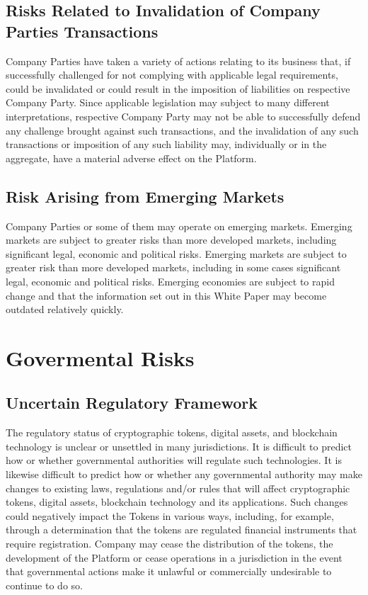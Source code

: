 \documentclass[12pt]{report}
\begin{document}
\subsection{Risks Related to Invalidation of Company Parties Transactions}
Company Parties have taken a variety of actions relating to its business that, if successfully challenged for not complying with applicable legal requirements, could be invalidated or could result in the imposition of liabilities on respective Company Party. Since applicable legislation may subject to many different interpretations, respective Company Party may not be able to successfully defend any challenge brought against such transactions, and the invalidation of any such transactions or imposition of any such liability may, individually or in the aggregate, have a
material adverse effect on the Platform.

\subsection{Risk Arising from Emerging Markets}
Company Parties or some of them may operate on emerging markets. Emerging markets are subject to greater risks than more developed markets, including significant legal, economic and political risks. Emerging markets are subject to greater risk than more developed markets, including in some cases significant legal, economic and political risks. Emerging economies are subject to rapid change and that the information set out in this White Paper may become outdated relatively quickly.

\section{Govermental Risks}
\subsection{Uncertain Regulatory Framework}
The regulatory status of cryptographic tokens, digital assets, and blockchain technology is unclear or unsettled in many jurisdictions. It is difficult to predict how or whether governmental authorities will regulate such technologies. It is likewise difficult to predict how or whether any governmental authority may make changes to existing laws, regulations and/or rules that will affect cryptographic tokens, digital assets, blockchain technology and its applications. Such changes could negatively impact the Tokens in various ways, including, for example, through a determination that the tokens are regulated financial instruments that require registration. Company may cease the distribution of the tokens, the development of the Platform or cease operations in a jurisdiction in the event that governmental actions make it unlawful or commercially undesirable to continue to do so.
\end{document}
